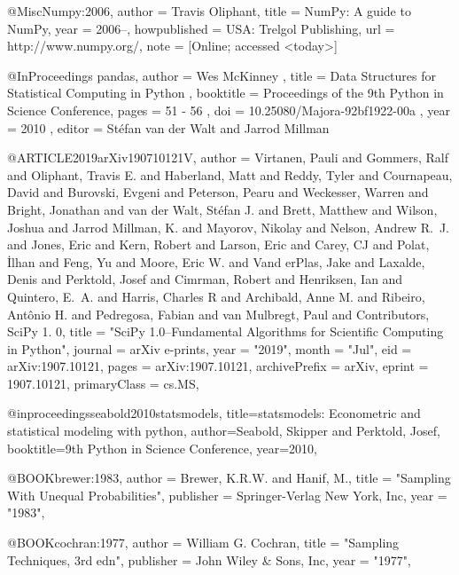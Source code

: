 @Misc{Numpy:2006,
  author =    {Travis Oliphant},
  title =     {{NumPy}: A guide to {NumPy}},
  year =      {2006--},
  howpublished = {USA: Trelgol Publishing},
  url = {http://www.numpy.org/},
  note = {[Online; accessed <today>]}
}


@InProceedings{ pandas,
  author    = { Wes McKinney },
  title     = { Data Structures for Statistical Computing in {P}ython },
  booktitle = {{Proceedings of the 9th Python in Science Conference}},
  pages     = { 51 - 56 },
  doi       = {  10.25080/Majora-92bf1922-00a },
  year      = { 2010 },
  editor    = { St\'efan van der Walt and Jarrod Millman }
}

@ARTICLE{2019arXiv190710121V,
       author = {{Virtanen}, Pauli and {Gommers}, Ralf and {Oliphant},
         Travis E. and {Haberland}, Matt and {Reddy}, Tyler and
         {Cournapeau}, David and {Burovski}, Evgeni and {Peterson}, Pearu
         and {Weckesser}, Warren and {Bright}, Jonathan and {van der Walt},
         St{\'e}fan J.  and {Brett}, Matthew and {Wilson}, Joshua and
         {Jarrod Millman}, K.  and {Mayorov}, Nikolay and {Nelson}, Andrew
         R.~J. and {Jones}, Eric and {Kern}, Robert and {Larson}, Eric and
         {Carey}, CJ and {Polat}, {\.I}lhan and {Feng}, Yu and {Moore},
         Eric W. and {Vand erPlas}, Jake and {Laxalde}, Denis and
         {Perktold}, Josef and {Cimrman}, Robert and {Henriksen}, Ian and
         {Quintero}, E.~A. and {Harris}, Charles R and {Archibald}, Anne M.
         and {Ribeiro}, Ant{\^o}nio H. and {Pedregosa}, Fabian and
         {van Mulbregt}, Paul and {Contributors}, SciPy 1. 0},
        title = "{SciPy 1.0--Fundamental Algorithms for Scientific
                  Computing in Python}",
      journal = {arXiv e-prints},
         year = "2019",
        month = "Jul",
          eid = {arXiv:1907.10121},
        pages = {arXiv:1907.10121},
archivePrefix = {arXiv},
       eprint = {1907.10121},
 primaryClass = {cs.MS},
}

@inproceedings{seabold2010statsmodels,
  title={statsmodels: Econometric and statistical modeling with python},
  author={Seabold, Skipper and Perktold, Josef},
  booktitle={9th Python in Science Conference},
  year={2010},
}

@BOOK{brewer:1983,
       author = {Brewer, K.R.W. and Hanif, M.},
        title = "{Sampling With Unequal Probabilities}",
      publisher = {Springer-Verlag New York, Inc},
         year = "1983",
}

@BOOK{cochran:1977,
       author = {William G. Cochran},
        title = "{Sampling Techniques, 3rd edn}",
      publisher = {John Wiley & Sons, Inc},
         year = "1977",
}

